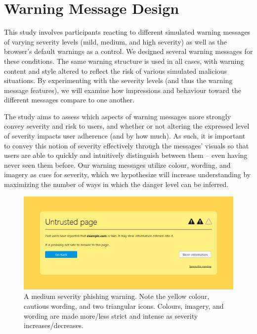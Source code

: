 \chapter{Warning Message Design}
\label{Design}

This study involves participants reacting to different simulated warning messages of varying severity levels (mild, medium, and high severity) as well as the browser's default warnings as a control. We designed several warning messages for these conditions. The same warning structure is used in all cases, with warning content and style altered to reflect the risk of various simulated malicious situations. By experimenting with the severity levels (and thus the warning message features), we will examine how impressions and behaviour toward the different messages compare to one another.

The study aims to assess which aspects of warning messages more strongly convey severity and risk to users, and whether or not altering the expressed level of severity impacts user adherence (and by how much). As such, it is important to convey this notion of severity effectively through the messages' visuals so that users are able to quickly and intuitively distinguish between them -- even having never seen them before. Our warning messages utilize colour, wording, and imagery as cues for severity, which we hypothesize will increase understanding by maximizing the number of ways in which the danger level can be inferred.

\begin{figure}[th]
	\centering
	\includegraphics[width=\textwidth]{Figures/Warning-Medium-Phishing}
	\decoRule
	\caption[Medium severity phishing warning]{A medium severity phishing warning. Note the yellow colour, cautious wording, and two triangular icons. Colours, imagery, and wording are made more/less strict and intense as severity increases/decreases.}
	\label{fig:Warning-Medium-Phishing}
\end{figure}

